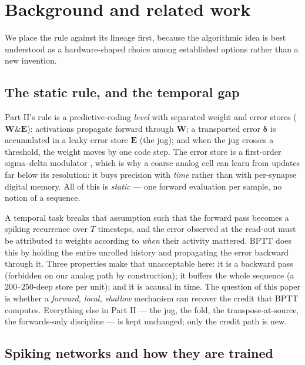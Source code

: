 \documentclass[11pt]{article}
\begin{document}
\hypertarget{sec:background}{%
\section{Background and related work}\label{sec:background}}

We place the rule against its lineage first, because the algorithmic
idea is best understood as a hardware-shaped choice among established
options rather than a new invention.

\hypertarget{the-static-rule-and-the-temporal-gap}{%
\subsection{The static rule, and the temporal
gap}\label{the-static-rule-and-the-temporal-gap}}

Part II's rule is a predictive-coding \emph{level} with separated weight
and error stores (\(\bm W\&\bm E\)): activations propagate forward
through \(\bm W\); a transported error \(\bm\delta\) is accumulated in a
leaky error store \(\bm E\) (the jug); and when the jug crosses a
threshold, the weight moves by one code step. The error store is a
first-order sigma--delta modulator \cite{oconnor2017sigma}, which is
why a coarse analog cell can learn from updates far below its
resolution: it buys precision with \emph{time} rather than with
per-synapse digital memory. All of this is \emph{static} --- one forward
evaluation per sample, no notion of a sequence.

A temporal task breaks that assumption such that the forward pass
becomes a spiking recurrence over \(T\) timesteps, and the error
observed at the read-out must be attributed to weights according to
\emph{when} their activity mattered. BPTT does this by holding the
entire unrolled history and propagating the error backward through it.
Three properties make that unacceptable here: it is a backward pass
(forbidden on our analog path by construction); it buffers the whole
sequence (a \(200\)--\(250\)-deep store per unit); and it is acausal in
time. The question of this paper is whether a \emph{forward, local,
shallow} mechanism can recover the credit that BPTT computes. Everything
else in Part II --- the jug, the fold, the transpose-at-source, the
forwards-only discipline --- is kept unchanged; only the credit path is
new.

\hypertarget{spiking-networks-and-how-they-are-trained}{%
\subsection{Spiking networks and how they are
trained}\label{spiking-networks-and-how-they-are-trained}}
\end{document}

